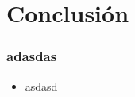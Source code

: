 
\section{Conclusión}

\begin{frame}
\frametitle{adasdas}

\begin{itemize}
\item asdasd
\end{itemize}

\end{frame}
